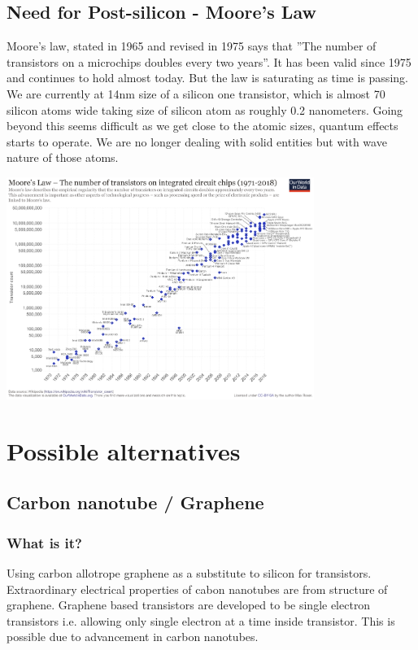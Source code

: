 \documentclass{article}
\begin{document}
    \subsection{Need for Post-silicon - Moore's Law}
    Moore’s law, stated in 1965 and revised in 1975 says that ”The number of transistors on a microchips doubles every two years”. It has been valid since 1975 and continues to hold almost today. But the law is saturating as time is passing. We are currently at 14nm size of a silicon one transistor, which is almost 70 silicon atoms wide taking size of silicon atom as roughly 0.2 nanometers. Going beyond this seems difficult as we get close to the atomic sizes, quantum effects starts to operate. We are no longer dealing with solid entities but with wave nature of those atoms.  \linebreak
    \linebreak
   \begin{center} \includegraphics[width=100mm,keepaspectratio]{moore.png}\end{center}
\section{Possible alternatives}
    \subsection{Carbon nanotube / Graphene}
        \subsubsection{What is it?}
        Using carbon allotrope graphene as a substitute to silicon for transistors. Extraordinary electrical properties of cabon nanotubes are from structure of graphene. Graphene based transistors are developed to be single electron transistors i.e. allowing only single electron at a time inside transistor. This is possible due to advancement in carbon nanotubes.
\end{document}

